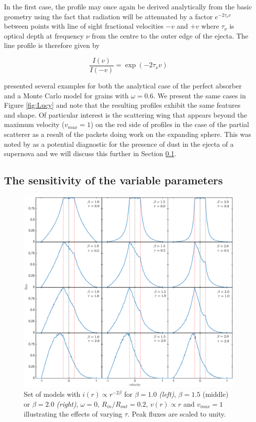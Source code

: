 \documentclass[useAMS,usenatbib,usegraphicx]{mnras}
\begin{document}
In the first case, the profile may once again be derived analytically from 
the basic geometry using the fact that radiation will be attenuated by a 
factor $e^{-2\tau_{\nu} v}$ between points with line of sight fractional velocities $-v$ and 
$+v$ where $\tau_{\nu}$ is optical depth at frequency $\nu$ from the centre to the outer edge of the ejecta.  The line profile is therefore given by

\begin{equation}
\frac{I(v)}{I(-v)} = \exp(-2\tau_{\nu} v)  
\end{equation}

\citet{Lucy1989} presented several examples for both the analytical case of 
the perfect absorber and a Monte Carlo model for grains with $\omega 
=0.6$.  We present the same cases in Figure \ref{fig:Lucy} and note that 
the resulting profiles exhibit the same features and shape. Of particular 
interest is the scattering wing that appears beyond the maximum velocity 
($v_{max}=1$) on the red side of profiles in the case of the partial 
scatterer as a result of the packets doing work on the expanding sphere.  
This was noted by \citet{Lucy1989} as a potential diagnostic for the 
presence of dust in the ejecta of a supernova and we will discuss this 
further in Section \ref{ps}.


\subsection{The sensitivity of the variable parameters}
\label{ps}


\begin{figure}
\includegraphics[trim =80 10 6 15,clip=true,scale=0.515]{params/D/newDall} 
\caption{Set of models with $i(r) \propto r^{-2\beta}$ for $\beta=1.0$ \textit{(left)}, $\beta=1.5$ (middle) or $\beta=2.0$ \textit{(right)}, $\omega=0$, 
$R_{in}/R_{out}=0.2$, $v(r) \propto r$ and $v_{max}=1$ illustrating the effects of varying 
$\tau$.  Peak fluxes are scaled to unity.}
\label{bt}
\end{figure}
\end{document}
